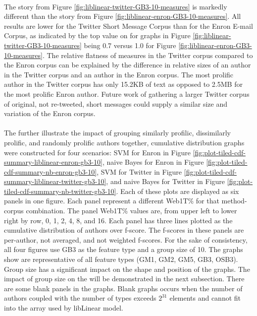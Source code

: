 	\paragraph*{} The story from Figure \ref{fig:liblinear-twitter-GB3-10-measures} is markedly different than the story from Figure \ref{fig:liblinear-enron-GB3-10-measures}.  All results are lower for the Twitter Short Message Corpus than for the Enron E-mail Corpus, as indicated by the top value on for graphs in Figure \ref{fig:liblinear-twitter-GB3-10-measures} being 0.7 versus 1.0 for Figure \ref{fig:liblinear-enron-GB3-10-measures}.  The relative flatness of measures in the Twitter corpus compared to the Enron corpus can be explained by the difference in relative sizes of an author in the Twitter corpus and an author in the Enron corpus.  The most prolific author in the Twitter corpus has only 15.2KB of text as opposed to 2.5MB for the most prolific Enron author.  Future work of gathering a larger Twitter corpus of original, not re-tweeted, short messages could supply a similar size and variation of the Enron corpus.
	
	\paragraph*{} The further illustrate the impact of grouping similarly profilic, dissimilarly prolific, and randomly prolific authors together, cumulative distribution graphs were constructed for four scenarios: SVM for Enron in Figure \ref{fig:plot-tiled-cdf-summary-liblinear-enron-gb3-10}, naive Bayes for Enron in Figure \ref{fig:plot-tiled-cdf-summary-nb-enron-gb3-10}, SVM for Twitter in Figure \ref{fig:plot-tiled-cdf-summary-liblinear-twitter-gb3-10}, and naive Bayes for Twitter in Figure \ref{fig:plot-tiled-cdf-summary-nb-twitter-gb3-10}.  Each of these plots are displayed as six panels in one figure.  Each panel represent a different Web1T\% for that method-corpus combination.  The panel Web1T\% values are, from upper left to lower right by row, 0, 1, 2, 4, 8, and 16.  Each panel has three lines plotted as the cumulative distribution of authors over f-score.  The f-scores in these panels are per-author, not averaged, and not weighted f-scores.  For the sake of consistency, all four figures use GB3 as the feature type and a group size of 10.  The graphs show are representative of all feature types (GM1, GM2, GM5, GB3, OSB3). Group size has a significant impact on the shape and position of the graphs.  The impact of group size on the will be demonstrated in the next subsection. There are some blank panels in the graphs.  Blank graphs occurs when the number of authors coupled with the number of types exceeds $2^{31}$ elements and cannot fit into the array used by libLinear model.
	
